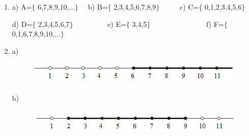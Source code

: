 \documentclass[12pt]{article}
\renewcommand{\_}{\kern-1.5pt\textunderscore\kern-1.5pt}
\begin{document}
\setlength{\parskip}{9.96pt}
\begin{enumerate}
	\item a) A=$ \{ $ 6,7,8,9,10,...$ \} $ \ \  \tab b) B=$ \{ $ 2,3,4,5,6,7,8,9$ \} $ \ \  \ \ \  c) C=$ \{ $ 0,1,2,3,4,5,6$ \} $ \par

\setlength{\parskip}{8.04pt}
\tab d) D=$ \{ $ 2,3,4,5,6,7$ \} $ \ \ \ \ \ \ \ \ \  e) E=$ \{ $ 3,4,5$ \} $ \ \ \ \ \ \ \ \  \tab \ \ \ \ \ \ \  f) F=$ \{ $ 0,1,6,7,8,9,10,...$ \} $ \par


\vspace{\baselineskip}
\setlength{\parskip}{9.96pt}
	\item  a) \par


\vspace{\baselineskip}



\begin{figure}[H]
	\begin{Center}
		\includegraphics[width=4.46in,height=0.43in]{./media/image11.png}
	\end{Center}
\end{figure}



\par

b) \par


\vspace{\baselineskip}



\begin{figure}[H]
	\begin{Center}
		\includegraphics[width=4.4in,height=0.48in]{./media/image12.png}
	\end{Center}
\end{figure}




\end{enumerate}
\end{document}
